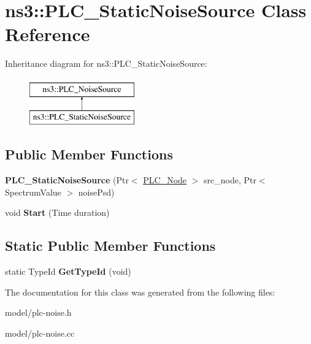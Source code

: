 \hypertarget{classns3_1_1PLC__StaticNoiseSource}{\section{ns3\-:\-:\-P\-L\-C\-\_\-\-Static\-Noise\-Source \-Class \-Reference}
\label{classns3_1_1PLC__StaticNoiseSource}
}
\-Inheritance diagram for ns3\-:\-:\-P\-L\-C\-\_\-\-Static\-Noise\-Source\-:\begin{figure}[H]
\begin{center}
\leavevmode
\includegraphics[height=2.000000cm]{classns3_1_1PLC__StaticNoiseSource}
\end{center}
\end{figure}
\subsection*{\-Public \-Member \-Functions}
\begin{DoxyCompactItemize}
\item 
\hypertarget{classns3_1_1PLC__StaticNoiseSource_a6ff8b14ea53478865d3718011960c8a4}{{\bfseries \-P\-L\-C\-\_\-\-Static\-Noise\-Source} (\-Ptr$<$ \hyperlink{classns3_1_1PLC__Node}{\-P\-L\-C\-\_\-\-Node} $>$ src\-\_\-node, \-Ptr$<$ \-Spectrum\-Value $>$ noise\-Psd)}\label{classns3_1_1PLC__StaticNoiseSource_a6ff8b14ea53478865d3718011960c8a4}

\item 
\hypertarget{classns3_1_1PLC__StaticNoiseSource_a2cdc9f92c961795126a7db193e929e6b}{void {\bfseries \-Start} (\-Time duration)}\label{classns3_1_1PLC__StaticNoiseSource_a2cdc9f92c961795126a7db193e929e6b}

\end{DoxyCompactItemize}
\subsection*{\-Static \-Public \-Member \-Functions}
\begin{DoxyCompactItemize}
\item 
\hypertarget{classns3_1_1PLC__StaticNoiseSource_a268a19f26e7f6c5d25782ffb2f7341a5}{static \-Type\-Id {\bfseries \-Get\-Type\-Id} (void)}\label{classns3_1_1PLC__StaticNoiseSource_a268a19f26e7f6c5d25782ffb2f7341a5}

\end{DoxyCompactItemize}


\-The documentation for this class was generated from the following files\-:\begin{DoxyCompactItemize}
\item 
model/plc-\/noise.\-h\item 
model/plc-\/noise.\-cc\end{DoxyCompactItemize}
